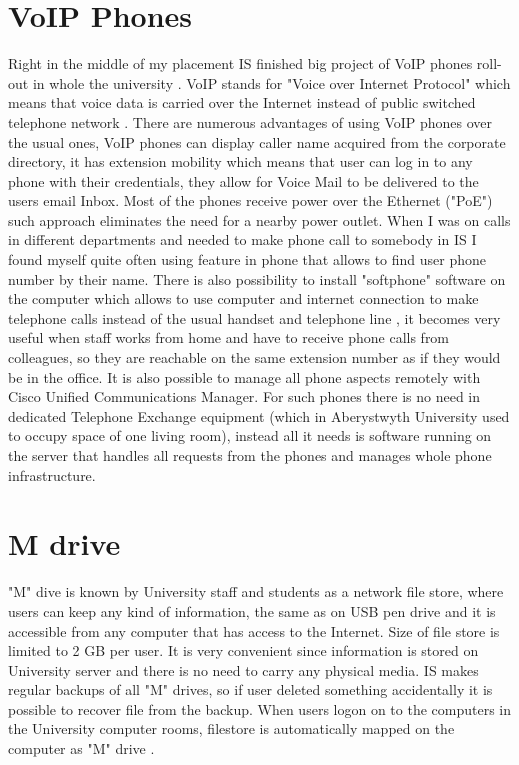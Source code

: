 \documentclass[10pt,a4paper,headinclude=true]{report}
\begin{document}
\section{VoIP Phones}
Right in the middle of my placement IS finished big project of VoIP phones roll-out in whole the university \cite{VoIP}. VoIP stands for "Voice over Internet Protocol" which means that voice data is carried over the Internet instead of public switched telephone network \cite{VoIP2}. There are numerous advantages of using VoIP phones over the usual ones, VoIP phones can display caller name acquired from the corporate directory, it has extension mobility which means that user can log in to any phone with their credentials, they allow for Voice Mail to be delivered to the users email Inbox. Most of the phones receive power over the Ethernet ("PoE") such approach eliminates the need for a nearby power outlet. When I was on calls in different departments and needed to make phone call to somebody in IS I found myself quite often using feature in phone that allows to find user phone number by their name. There is also possibility to install "softphone" software on the computer which allows to use computer and internet connection to make telephone calls instead of the usual handset and telephone line \cite{VoIP3}, it becomes very useful when staff works from home and have to receive phone calls from colleagues, so they are reachable on the same extension number as if they would be in the office. It is also possible to manage all phone aspects remotely with Cisco Unified Communications Manager. For such phones there is no need in dedicated Telephone Exchange equipment (which in Aberystwyth University used to occupy space of one living room), instead all it needs is software running on the server that handles all requests from the phones and manages whole phone infrastructure.  
\section{M drive}
"M" dive is known by University staff and students as a network file store, where users can keep any kind of information, the same as on USB pen drive and it is accessible from any computer that has access to the Internet. Size of file store is limited to 2 GB per user.  It is very convenient since information is stored on University server and there is no need to carry any physical media. IS makes regular backups of all "M" drives, so if user deleted something accidentally it is possible to recover file from the backup. When users logon on to the computers in the University computer rooms, filestore is automatically mapped on the computer as "M" drive \cite{MDrive}.
\end{document}
